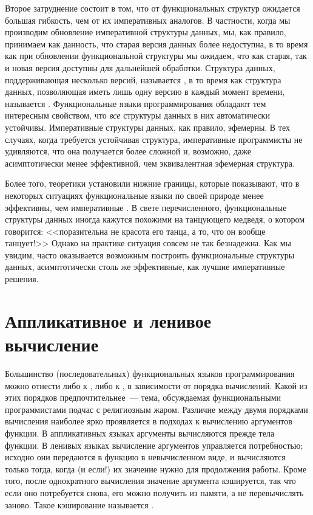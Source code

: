 Второе затруднение состоит в том, что от функциональных структур
ожидается большая гибкость, чем от их императивных аналогов.  В
частности, когда мы производим обновление императивной структуры
данных, мы, как правило, принимаем как данность, что старая версия
данных более недоступна, в то время как при обновлении функциональной
структуры мы ожидаем, что как старая, так и новая версия доступны для
дальнейшей обработки. Структура данных, поддерживающая несколько
версий, называется , в то время как
структура данных, позволяющая иметь лишь одну версию в каждый момент
времени, называется 
\cite{Driscoll-etal1989}. Функциональные языки программирования обладают тем
интересным свойством, что \emph{все} структуры данных в них
автоматически устойчивы. Императивные структуры данных, как правило,
эфемерны. В тех случаях, когда требуется устойчивая структура,
императивные программисты не удивляются, что она получается более
сложной и, возможно, даже асимптотически менее эффективной, чем
эквивалентная эфемерная структура.

Более того, теоретики установили нижние границы, которые показывают,
что в некоторых ситуациях функциональные языки по своей природе менее
эффективны, чем императивные \cite{BenAmramGalil1992, Pippenger1996}.  В свете
перечисленного, функциональные структуры данных иногда кажутся
похожими на танцующего медведя, о котором говорится: <<поразительна не
красота его танца, а то, что он вообще
танцует!>> Однако на практике ситуация совсем не так безнадежна. Как
мы увидим, часто оказывается возможным построить функциональные
структуры данных, асимптотически столь же эффективные, как лучшие
императивные решения.

\section{Аппликативное и ленивое вычисление}

Большинство (последовательных) функциональных языков программирования
можно отнести либо к , либо к
, в зависимости от порядка вычислений.  Какой из
этих порядков предпочтительнее~--- тема, обсуждаемая функциональными
программистами подчас с религиозным жаром.  Различие между двумя
порядками вычисления наиболее ярко проявляется в подходах к вычислению
аргументов функции. В аппликативных языках аргументы вычисляются
прежде тела функции. В ленивых языках вычисление аргументов управляется
потребностью; исходно они передаются в функцию в невычисленном виде, и
вычисляются только тогда, когда (и если!) их значение нужно
для продолжения работы.  Кроме того, после однократного вычисления
значение аргумента кэшируется, так что если оно потребуется снова, его
можно получить из памяти, а не перевычислять заново.  Такое
кэширование называется 
\cite{Michie1968}.

